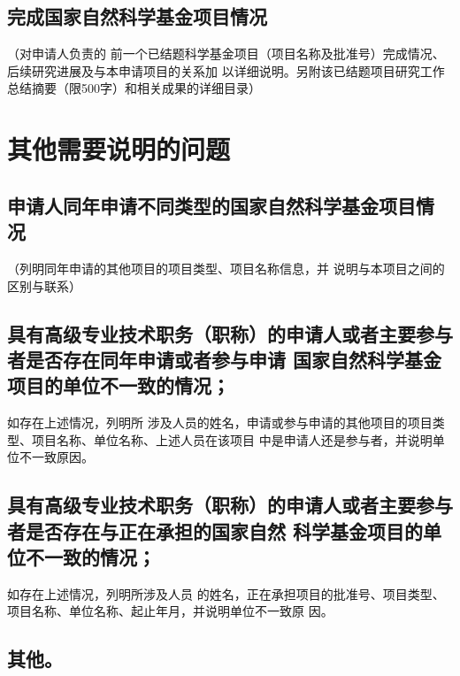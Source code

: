 \documentclass[a4paper,12pt, AutoFakeBold, fontset=adobe]{ctexart}
\begin{document}
\subsection{完成国家自然科学基金项目情况}{\color{nsfcblue}\kaishu\noindent（对申请人负责的
  前一个已结题科学基金项目（项目名称及批准号）完成情况、后续研究进展及与本申请项目的关系加
  以详细说明。另附该已结题项目研究工作总结摘要（限500字）和相关成果的详细目录）}

\section{其他需要说明的问题}


\subsection{申请人同年申请不同类型的国家自然科学基金项目情
  况}{\color{nsfcblue}\kaishu\noindent（列明同年申请的其他项目的项目类型、项目名称信息，并
  说明与本项目之间的区别与联系）}

\subsection{具有高级专业技术职务（职称）的申请人或者主要参与者是否存在同年申请或者参与申请
  国家自然科学基金项目的单位不一致的情况；}{\color{nsfcblue}\kaishu 如存在上述情况，列明所
  涉及人员的姓名，申请或参与申请的其他项目的项目类型、项目名称、单位名称、上述人员在该项目
  中是申请人还是参与者，并说明单位不一致原因。}

\subsection{具有高级专业技术职务（职称）的申请人或者主要参与者是否存在与正在承担的国家自然
  科学基金项目的单位不一致的情况；}{\color{nsfcblue}\kaishu 如存在上述情况，列明所涉及人员
  的姓名，正在承担项目的批准号、项目类型、项目名称、单位名称、起止年月，并说明单位不一致原
  因。}

\subsection{其他。}
\end{document}
